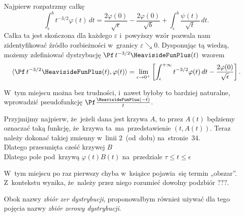 \documentclass[a4paper,11pt]{article}
\numberwithin{equation}{section}
\begin{document}
Najpierw rozpatrzmy całkę
\begin{equation}
  \label{eq:Zemanian-02}
  \int_{ \epsilon }^{ b } t^{ -3/2 } \varphi( t ) \, dt =
  \frac{ 2 \varphi( 0 ) }{ \sqrt{ \epsilon } } - \frac{ 2 \varphi( 0 ) }{ \sqrt{ b } }
  + \int_{ \epsilon }^{ b } \frac{ \psi( t ) }{ \sqrt{ t } } \, dt.
\end{equation}
Całka ta jest skończona dla każdego $\varepsilon$ i~powyższy wzór pozwala
nam zidentyfikować źródło rozbieżności w~granicy $\varepsilon \searrow 0$.
Dysponując tą wiedzą, możemy zdefiniować dystrybucję
$\Pf \, t^{ -3 / 2 } \HeavisideFunPlus( t )$ wzorem
\begin{equation}
  \label{eq:Zemanian-03}
  \langle \Pf \, t^{ -3/2 } \HeavisideFunPlus( t ), \varphi( t ) \rangle =
  \lim_{ \epsilon \to 0^{ + } } \left[ \int_{ \epsilon }^{ +\infty } t^{ -3/2 } \varphi( t ) \, dt
    - \frac{ 2 \varphi( 0 ) }{ \sqrt{ \epsilon } } \right].
\end{equation}

\VerSpaceFour





\noindent
{} W~tym miejscu można bez trudności, i~nawet byłoby to
bardziej naturalne, wprowadzić pseudofunkcję
$\Pf \frac{ \HeavisideFunPlus( -t )}{ t }$.

\VerSpaceFour





\noindent
{} Przyjmijmy najpierw, że~jeżeli dana jest krzywa
$A$, to przez $A( t )$ będziemy oznaczać taką funkcję, że~krzywa
ta~ma~przedstawienie $( t, A( t ) )$. Teraz należy dokonać takiej
zmienny w~linii 2~(od~dołu) na~stronie~34. \\
\Jest  Dlatego przesunięta cześć krzywej $B$ \\
\Powin Dlatego pole pod~krzywą $\varphi( t ) B( t )$ na~przedziale
$\tau \leq t \leq \epsilon$

\VerSpaceFour





\noindent
{} W~tym miejscu po raz pierwszy chyba w~książce
pojawia~się termin „obszar”. Z~kontekstu wynika, że~należy przez
niego rozumieć dowolny podzbiór $???$.

\VerSpaceFour





\noindent
{} Obok nazwy \textit{zbiór zer dystrybucji}, proponowałbym
również używać dla tego pojęcia nazwy \textit{zbiór zerowy dystrybucji}.
\end{document}

